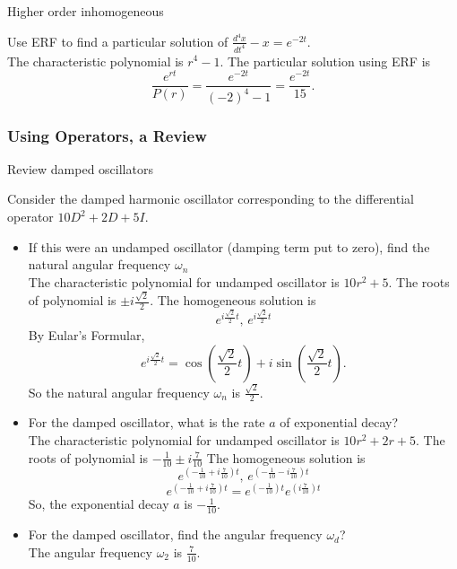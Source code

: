 \begin{problem}
  Higher order inhomogeneous
\end{problem}
Use ERF to find a particular solution of $\displaystyle {\frac{d^{4}x}{dt^{4}}-x=e^{-2t}}$. \\

The characteristic polynomial is $r^4 - 1$.
The particular solution using ERF is
\begin{equation*}
  \frac{e^{rt}}{P(r)} = \frac{e^{-2t}}{(-2)^4 -1} = \frac{e^{-2t}}{15}.  
\end{equation*}
\clearpage

\subsubsection{Using Operators, a Review}
\begin{problem}
  Review damped oscillators
\end{problem}
Consider the damped harmonic oscillator corresponding to the differential operator
$10D^2 + 2D + 5I$. \\
\begin{itemize}
\item If this were an undamped oscillator (damping term put to zero), find the natural angular frequency
  $\omega _n$\\
  
  The characteristic polynomial for undamped oscillator is $10r^2 + 5$.
  The roots of polynomial is $\pm i \frac{\sqrt{2}}{2}$.
  The homogeneous solution is
  \begin{equation*}
    e^{i \frac{\sqrt{2}}{2} t},\, e^{i \frac{\sqrt{2}}{2} t}
  \end{equation*}
  By Eular's Formular,
  \begin{equation*}
    e^{i \frac{\sqrt{2}}{2} t} = \cos(\frac{\sqrt{2}}{2} t) + i \sin (\frac{\sqrt{2}}{2} t). 
  \end{equation*}
  So the natural angular frequency $\omega _n $ is $\frac{\sqrt{2}}{2}$.

\item For the damped oscillator, what is the rate $a$ of exponential decay? \\
  
  The characteristic polynomial for undamped oscillator is $10r^2 + 2r + 5$.
  The roots of polynomial is $-\frac{1}{10} \pm i \frac{7}{10}$
  The homogeneous solution is
  \begin{equation*}
    \displaystyle e^{(-\frac{1}{10} + i \frac{7}{10})t},\, e^{(-\frac{1}{10} - i \frac{7}{10})t}
  \end{equation*}
  \begin{equation*}
    \displaystyle e^{(-\frac{1}{10} + i \frac{7}{10})t}
    \displaystyle = e^{(-\frac{1}{10})t} e^{(i \frac{7}{10})t}
  \end{equation*}
  So, the exponential decay $a$ is $-\frac{1}{10}$.

\item For the damped oscillator, find the angular frequency $\omega _d$?\\
  
  The angular frequency $\omega _2$ is $\frac{7}{10}$. 
\end{itemize}
\clearpage


